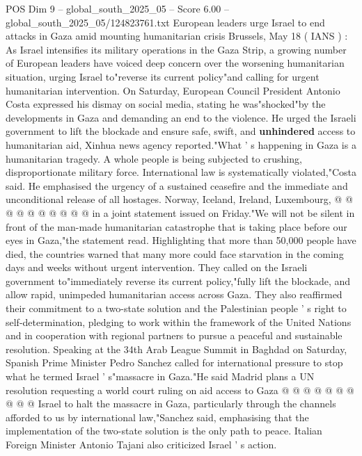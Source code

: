 \begin{textsample}{POS Dim 9 – global\_south\_2025\_05 – Score 6.00 – global\_south\_2025\_05/124823761.txt}  \label{ex:f9_pos_205}
European leaders urge Israel to end attacks in Gaza amid mounting humanitarian crisis Brussels, May 18 ( IANS ) : As Israel intensifies its military operations in the Gaza Strip, a growing number of European leaders have voiced deep concern over the worsening humanitarian situation, urging Israel to"reverse its current policy"and calling for urgent humanitarian intervention.
On Saturday, European Council President Antonio Costa expressed his dismay on social media, stating he was"shocked"by the developments in Gaza and demanding an end to the violence.
He urged the Israeli government to lift the blockade and ensure safe, swift, and \textbf{unhindered} access to humanitarian aid, Xinhua news agency reported."What ' s happening in Gaza is a humanitarian tragedy.
A whole people is being subjected to crushing, disproportionate military force.
International law is systematically violated,"Costa said.
He emphasised the urgency of a sustained ceasefire and the immediate and unconditional release of all hostages.
Norway, Iceland, Ireland, Luxembourg, @ @ @ @ @ @ @ @ @ @ in a joint statement issued on Friday."We will not be silent in front of the man-made humanitarian catastrophe that is taking place before our eyes in Gaza,"the statement read.
Highlighting that more than 50,000 people have died, the countries warned that many more could face starvation in the coming days and weeks without urgent intervention.
They called on the Israeli government to"immediately reverse its current policy,"fully lift the blockade, and allow rapid, unimpeded humanitarian access across Gaza.
They also reaffirmed their commitment to a two-state solution and the Palestinian people ' s right to self-determination, pledging to work within the framework of the United Nations and in cooperation with regional partners to pursue a peaceful and sustainable resolution.
Speaking at the 34th Arab League Summit in Baghdad on Saturday, Spanish Prime Minister Pedro Sanchez called for international pressure to stop what he termed Israel ' s"massacre in Gaza."He said Madrid plans a UN resolution requesting a world court ruling on aid access to Gaza @ @ @ @ @ @ @ @ @ @ Israel to halt the massacre in Gaza, particularly through the channels afforded to us by international law,"Sanchez said, emphasising that the implementation of the two-state solution is the only path to peace.
Italian Foreign Minister Antonio Tajani also criticized Israel ' s action.

\end{textsample}
